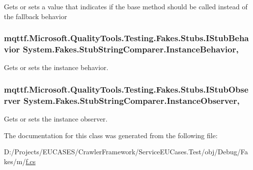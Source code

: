 Gets or sets a value that indicates if the base method should be called instead of the fallback behavior

\hypertarget{class_system_1_1_fakes_1_1_stub_string_comparer_ad3f62cb99fad6051bf3dc7a5a5744ced}{
\subsubsection[{Instance\-Behavior}]{\setlength{\rightskip}{0pt plus 5cm}mqttf.\-Microsoft.\-Quality\-Tools.\-Testing.\-Fakes.\-Stubs.\-I\-Stub\-Behavior System.\-Fakes.\-Stub\-String\-Comparer.\-Instance\-Behavior\hspace{0.3cm}{\ttfamily [get]}, {\ttfamily [set]}}}\label{class_system_1_1_fakes_1_1_stub_string_comparer_ad3f62cb99fad6051bf3dc7a5a5744ced}


Gets or sets the instance behavior.

\hypertarget{class_system_1_1_fakes_1_1_stub_string_comparer_a06d09dd25a55687d1be4ca9e297f9f3d}{
\subsubsection[{Instance\-Observer}]{\setlength{\rightskip}{0pt plus 5cm}mqttf.\-Microsoft.\-Quality\-Tools.\-Testing.\-Fakes.\-Stubs.\-I\-Stub\-Observer System.\-Fakes.\-Stub\-String\-Comparer.\-Instance\-Observer\hspace{0.3cm}{\ttfamily [get]}, {\ttfamily [set]}}}\label{class_system_1_1_fakes_1_1_stub_string_comparer_a06d09dd25a55687d1be4ca9e297f9f3d}


Gets or sets the instance observer.



The documentation for this class was generated from the following file\-:\begin{DoxyCompactItemize}
\item 
D\-:/\-Projects/\-E\-U\-C\-A\-S\-E\-S/\-Crawler\-Framework/\-Service\-E\-U\-Cases.\-Test/obj/\-Debug/\-Fakes/m/\hyperlink{m_2f_8cs}{f.\-cs}\end{DoxyCompactItemize}
